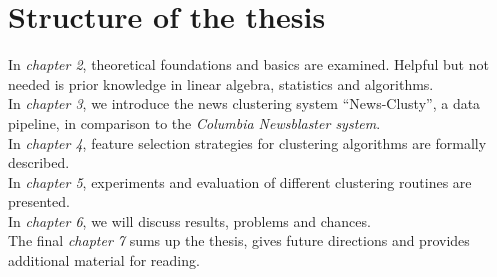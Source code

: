 \section{Structure of the thesis}
  In \emph{chapter 2}, theoretical foundations and basics are examined. Helpful but not needed is prior knowledge in linear algebra, statistics and algorithms.\\
  In \emph{chapter 3}, we introduce the news clustering system ``News-Clusty'', a data pipeline, in comparison to the \emph{Columbia Newsblaster system}.\\
  In \emph{chapter 4}, feature selection strategies for clustering algorithms are formally described.\\
  In \emph{chapter 5}, experiments and evaluation of different clustering routines are presented.\\
  In \emph{chapter 6}, we will discuss results, problems and chances.\\
  The final \emph{chapter 7} sums up the thesis, gives future directions and provides additional material for reading.

